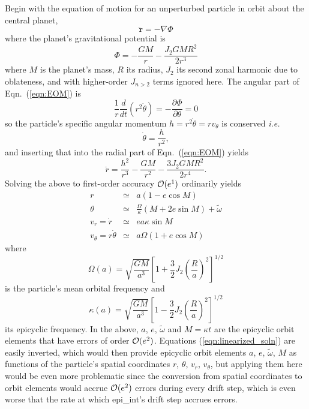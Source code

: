 \documentclass[preprint]{aastex62}
\begin{document}
Begin with the equation of motion for an unperturbed particle in orbit about the central planet, 
\begin{equation}
    \label{eqn:EOM}
    \ddot{\mathbf{r}}=-\nabla\Phi
\end{equation}
where the planet's gravitational potential is
\begin{equation}
    \label{eqn:Phi}
    \Phi = -\frac{GM}{r} - \frac{J_2GMR^2}{2r^3}
\end{equation}
where $M$ is the planet's mass, $R$ its radius, $J_2$ its second zonal harmonic due to oblateness,
and with higher-order $J_{n>2}$ terms ignored here. The angular part of Eqn.\ (\ref{eqn:EOM}) is
\begin{equation}
    \label{eqn:angular_EOM}
    \frac{1}{r}\frac{d}{dt}(r^2\dot{\theta}) = -\frac{\partial\Phi}{\partial\theta} = 0
\end{equation}
so the particle's specific angular momentum $h=r^2\dot{\theta}=r v_\theta$ is conserved {\it i.e.}
\begin{equation}
    \label{eqn:theta-dot}
    \dot{\theta} = \frac{h}{r^2},
\end{equation}
and inserting that into the radial part of Eqn.\ (\ref{eqn:EOM}) yields
\begin{equation}
    \label{eqn:radial_EOM}
    \ddot{r} = \frac{h^2}{r^3} -\frac{GM}{r^2} - \frac{3J_2GMR^2}{2r^4}.
\end{equation}
Solving the above to first-order accuracy ${\cal O}(e^1)$ ordinarily yields
\begin{eqnarray}
    \label{eqn:linearized_soln}
    r &\simeq& a(1-e\cos M) \nonumber\\
    \theta &\simeq& \frac{\Omega}{\kappa}(M+2e\sin M) + \tilde{\omega} \nonumber\\
    v_r = \dot{r} &\simeq& ea\kappa\sin M \nonumber\\
    v_\theta = r\dot{\theta} &\simeq& a\Omega(1 + e\cos M)
\end{eqnarray}
where
\begin{equation}
    \label{eqn:omega}
    \Omega(a) = \sqrt{\frac{GM}{a^3}}\left[1 + \frac{3}{2}J_2\left(\frac{R}{a}\right)^2\right]^{1/2}
\end{equation}
is the particle's mean orbital frequency and 
\begin{equation}
    \label{eqn:kappa}
    \kappa(a) = \sqrt{\frac{GM}{a^3}}\left[1 - \frac{3}{2}J_2\left(\frac{R}{a}\right)^2\right]^{1/2}
\end{equation}
its epicyclic frequency. In the above,  $a$, $e$, $\tilde{\omega}$ and $M=\kappa t$ are the epicyclic orbit elements
that have errors of order ${\cal O}(e^2)$. Equations (\ref{eqn:linearized_soln})
are easily inverted, which would then provide epicyclic
orbit elements $a$, $e$, $\tilde{\omega}$, $M$ as functions of the particle's 
spatial coordinates $r$, $\theta$, $v_r$, $v_\theta$, but applying them
here would be even more problematic since the conversion from spatial coordinates to
orbit elements would accrue ${\cal O}(e^2)$ errors during every drift step, which is even
worse that the rate at which epi\_int's drift step accrues errors.
\end{document}
